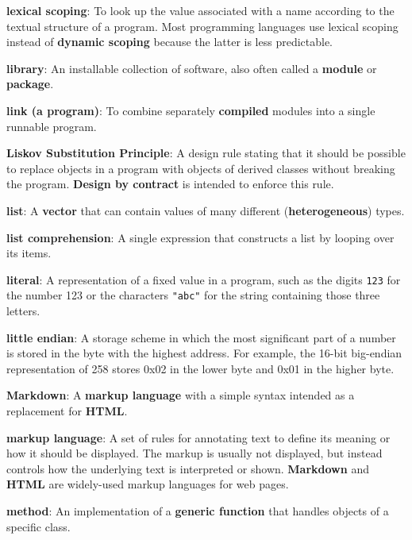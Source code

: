 \documentclass{scrbook}
\newcommand{\glosskey}[1]{\textbf{#1}}
\begin{document}
\noindent \textbf{\glosskey{lexical scoping}}: 
To look up the value associated with a name according to the textual structure of a program. Most programming languages use lexical scoping instead of \glosskey{dynamic scoping} because the latter is less predictable.


\noindent \textbf{\glosskey{library}}: 
An installable collection of software, also often called a \glosskey{module} or \glosskey{package}.


\noindent \textbf{\glosskey{link (a program)}}: 
To combine separately \glosskey{compiled} modules into a single runnable program.


\noindent \textbf{\glosskey{Liskov Substitution Principle}}: 
A design rule stating that it should be possible to replace objects in a program with objects of derived classes without breaking the program. \glosskey{Design by contract} is intended to enforce this rule.


\noindent \textbf{\glosskey{list}}: 
A \glosskey{vector} that can contain values of many different (\glosskey{heterogeneous}) types.


\noindent \textbf{\glosskey{list comprehension}}: 
A single expression that constructs a list by looping over its items.


\noindent \textbf{\glosskey{literal}}: 
A representation of a fixed value in a program, such as the digits \texttt{123} for the number 123 or the characters \texttt{"abc"} for the string containing those three letters.


\noindent \textbf{\glosskey{little endian}}: 
A storage scheme in which the most significant part of a number is stored in the byte with the highest address. For example, the 16-bit big-endian representation of 258 stores 0x02 in the lower byte and 0x01 in the higher byte.


\noindent \textbf{\glosskey{Markdown}}: 
A \glosskey{markup language} with a simple syntax intended as a replacement for \glosskey{HTML}.


\noindent \textbf{\glosskey{markup language}}: 
A set of rules for annotating text to define its meaning or how it should be displayed. The markup is usually not displayed, but instead controls how the underlying text is interpreted or shown. \glosskey{Markdown} and \glosskey{HTML} are widely-used markup languages for web pages.


\noindent \textbf{\glosskey{method}}: 
An implementation of a \glosskey{generic function} that handles objects of a specific class.
\end{document}
